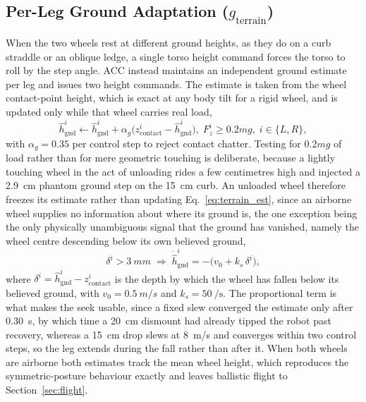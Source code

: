 \documentclass[a4paper,fleqn]{cas-dc}
\begin{document}
\subsection{Per-Leg Ground Adaptation ($g_{\text{terrain}}$)}
\label{sec:terrain}

When the two wheels rest at different ground heights, as they do on a curb
straddle or an oblique ledge, a single torso height command forces the torso to
roll by the step angle. ACC instead maintains an independent ground estimate per
leg and issues two height commands. The estimate is taken from the wheel
contact-point height, which is exact at any body tilt for a rigid wheel, and is
updated only while that wheel carries real load,
\begin{equation}
\hat{h}_{\text{gnd}}^{i} \leftarrow \hat{h}_{\text{gnd}}^{i}
+ \alpha_g\big(z_{\text{contact}}^{i} - \hat{h}_{\text{gnd}}^{i}\big),
\; F_z^{i} \geq 0.2mg, \; i \in \{L,R\},
\label{eq:terrain_est}
\end{equation}
with $\alpha_g = 0.35$ per control step to reject contact chatter. Testing for
\num{0.2}$mg$ of load rather than for mere geometric touching is deliberate,
because a lightly touching wheel in the act of unloading rides a few centimetres
high and injected a \SI{+2.9}{cm} phantom ground step on the \SI{15}{cm} curb. An
unloaded wheel therefore freezes its estimate rather than updating
Eq.~\eqref{eq:terrain_est}, since an airborne wheel supplies no information about
where its ground is, the one exception being the only physically unambiguous
signal that the ground has vanished, namely the wheel centre descending below its
own believed ground,
\begin{equation}
\delta^{i} > \SI{3}{mm}
\;\Rightarrow\;
\dot{\hat{h}}_{\text{gnd}}^{i} = -\big(v_0 + k_s \,\delta^{i}\big),
\label{eq:terrain_seek}
\end{equation}
where $\delta^{i} = \hat{h}_{\text{gnd}}^{i} - z_{\text{contact}}^{i}$ is the
depth by which the wheel has fallen below its believed ground,
with $v_0 = \SI{0.5}{m/s}$ and $k_s = \SI{50}{\per\second}$. The proportional
term is what makes the seek usable, since a fixed slew converged the estimate
only after \SI{0.30}{s}, by which time a \SI{20}{cm} dismount had already tipped
the robot past recovery, whereas a \SI{15}{cm} drop slews at \SI{8}{m/s} and
converges within two control steps, so the leg extends during the fall rather
than after it. When both wheels are airborne both estimates track the mean wheel
height, which reproduces the symmetric-posture behaviour exactly and leaves
ballistic flight to Section~\ref{sec:flight}.
\end{document}
